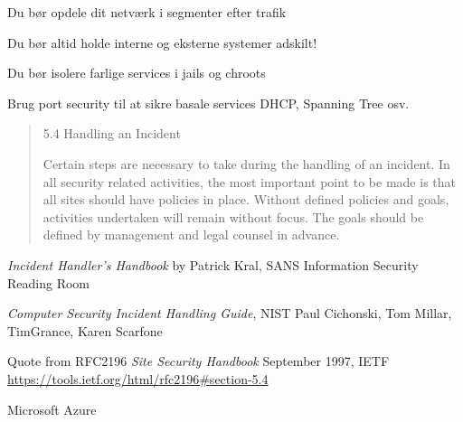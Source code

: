 \documentclass[Screen16to9,17pt]{foils}
\begin{document}


\begin{list1}
\item Du bør opdele dit netværk i segmenter efter trafik
\item Du bør altid holde interne og eksterne systemer adskilt!
\item Du bør isolere farlige services i jails og chroots
\item Brug port security til at sikre basale services DHCP, Spanning Tree osv.
\end{list1}



\begin{quote}
  5.4  Handling an Incident

     Certain steps are necessary to take during the handling of an
     incident.  In all security related activities, the most important
     point to be made is that all sites should have policies in place.
     Without defined policies and goals, activities undertaken will remain
     without focus. The goals should be defined by management and legal
     counsel in advance.
\end{quote}

\begin{list2}
\item \emph{Incident Handler's Handbook}
  by Patrick Kral, SANS Information Security Reading Room\\
  {\footnotesize {}}
  \item \emph{Computer Security
Incident Handling Guide}, NIST Paul Cichonski,
Tom Millar,
TimGrance,
Karen Scarfone\\ {\footnotesize{}}
\item Quote from RFC2196 \emph{Site Security Handbook} September 1997, IETF\\
{\footnotesize\url{https://tools.ietf.org/html/rfc2196#section-5.4}}
\item {}
\item Microsoft Azure
\end{list2}
\end{document}
